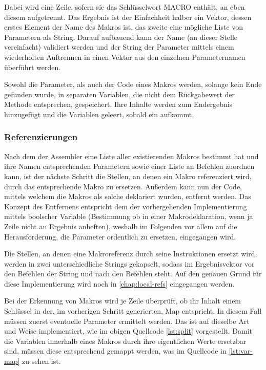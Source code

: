 Dabei wird eine Zeile, sofern sie das Schlüsselwort \glqq MACRO\grqq{} enthält, an eben diesem aufgetrennt. Das Ergebnis ist der Einfachheit halber ein Vektor, dessen erstes Element der Name des Makros ist, das zweite eine mögliche Liste von Parametern als String. Darauf aufbauend kann der Name (an dieser Stelle vereinfacht) validiert werden und der String der Parameter mittels einem wiederholten Auftrennen in einen Vektor aus den einzelnen Parameternamen überführt werden.

Sowohl die Parameter, als auch der Code eines Makros werden, solange kein Ende gefunden wurde, in separaten Variablen, die nicht dem Rückgabewert der Methode entsprechen, gespeichert. Ihre Inhalte werden zum Endergebnis hinzugefügt und die Variablen geleert, sobald ein  aufkommt.

\subsubsection{Referenzierungen}

Nach dem der Assembler eine Liste aller existierenden Makros bestimmt hat und ihre Namen entsprechenden Parametern sowie einer Liste an Befehlen zuordnen kann, ist der nächste Schritt die Stellen, an denen ein Makro referenziert wird, durch das entsprechende Makro zu ersetzen. Außerdem kann nun der Code, mittels welchem die Makros als solche deklariert wurden, entfernt werden. Das Konzept des Entfernens entspricht dem der vorhergehenden Implementierung mittels boolscher Variable (Bestimmung ob in einer Makrodeklaration, wenn ja Zeile nicht an Ergebnis anheften), weshalb im Folgenden vor allem auf die Herausforderung, die Parameter ordentlich zu ersetzen, eingegangen wird.

Die Stellen, an denen eine Makroreferenz durch seine Instruktionen ersetzt wird, werden in zwei unterschiedliche Strings gekapselt, sodass im Ergebnisvektor vor den Befehlen der String  und nach den Befehlen  steht. Auf den genauen Grund für diese Implementierung wird noch in \ref{chap:local-refs} eingegangen werden.

Bei der Erkennung von Makros wird je Zeile überprüft, ob ihr Inhalt einem Schlüssel in der, im vorherigen Schritt generierten, Map entspricht. In diesem Fall müssen zuerst eventuelle Parameter ermittelt werden. Das ist auf dieselbe Art und Weise implementiert, wie im obigen Quellcode \ref{lst:split} vorgestellt. Damit die Variablen innerhalb eines Makros durch ihre eigentlichen Werte ersetzbar sind, müssen diese entsprechend gemappt werden, was im Quellcode in \ref{lst:var-map} zu sehen ist.

